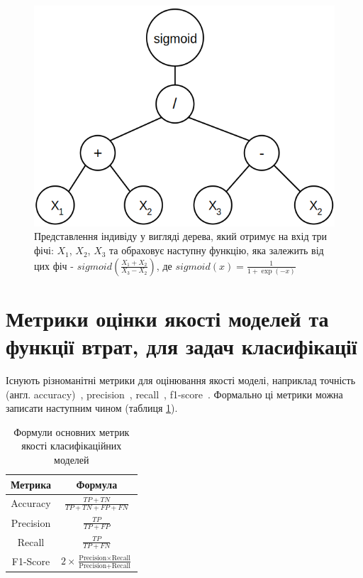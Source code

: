 \begin{figure}[ht]
	\centering
	\includegraphics[scale=0.5]{Images/genotype_example.png}
	\caption{Представлення індивіду у вигляді дерева, який отримує на вхід три фічі: $X_1$, $X_2$, $X_3$ та обраховує наступну функцію, яка залежить від цих фіч - $sigmoid\left(\frac{X_1 + X_2}{X_3 - X_2}\right)$, де $sigmoid(x) = \frac{1}{1 + \exp(-x)}$}
	\label{fig_genotype}
\end{figure}

\section{Метрики оцінки якості моделей та функції втрат, для задач класифікації}\label{sec:metrics}


Існують різноманітні метрики для оцінювання якості моделі, наприклад точність (англ. accuracy)~\cite{ct6}, precision~\cite{ct6}, recall~\cite{ct7}, f1-score~\cite{ct8}. Формально ці метрики можна записати наступним чином (таблиця \ref{tab_metrics}).

\begin{table}[ht]
	\setfontsize{14pt}
	\centering
	\begin{tabular}{|c|c|}
		\hline
		Метрика & Формула \\
		\hline
		Accuracy & $\frac{TP + TN}{TP + TN + FP + FN}$ \\
		\hline
		Precision & $\frac{TP}{TP + FP}$ \\
		\hline
		Recall & $\frac{TP}{TP + FN}$ \\
		\hline
		F1-Score & $2 \times \frac{\text{Precision} \times \text{Recall}}{\text{Precision} + \text{Recall}}$ \\
		\hline
	\end{tabular}
	\caption{Формули основних метрик якості класифікаційних моделей}
	\label{tab_metrics}
\end{table}

